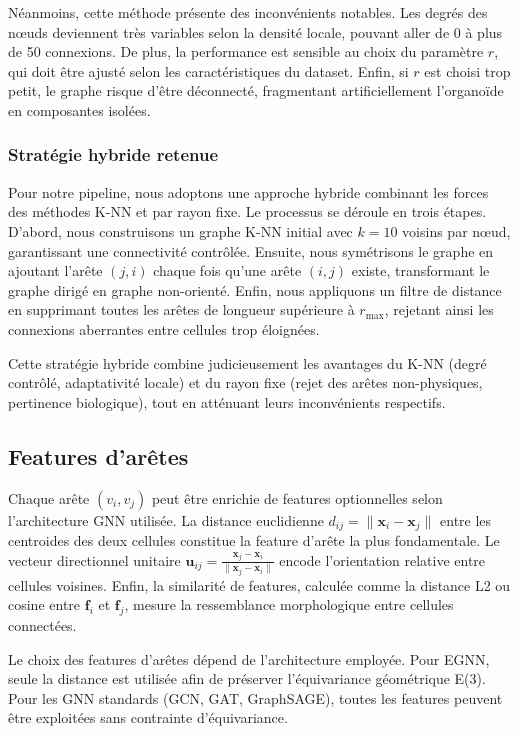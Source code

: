 Néanmoins, cette méthode présente des inconvénients notables. Les degrés des nœuds deviennent très variables selon la densité locale, pouvant aller de 0 à plus de 50 connexions. De plus, la performance est sensible au choix du paramètre $r$, qui doit être ajusté selon les caractéristiques du dataset. Enfin, si $r$ est choisi trop petit, le graphe risque d'être déconnecté, fragmentant artificiellement l'organoïde en composantes isolées.

\subsubsection{Stratégie hybride retenue}

Pour notre pipeline, nous adoptons une approche hybride combinant les forces des méthodes K-NN et par rayon fixe. Le processus se déroule en trois étapes. D'abord, nous construisons un graphe K-NN initial avec $k = 10$ voisins par nœud, garantissant une connectivité contrôlée. Ensuite, nous symétrisons le graphe en ajoutant l'arête $(j,i)$ chaque fois qu'une arête $(i,j)$ existe, transformant le graphe dirigé en graphe non-orienté. Enfin, nous appliquons un filtre de distance en supprimant toutes les arêtes de longueur supérieure à $r_{\max}$, rejetant ainsi les connexions aberrantes entre cellules trop éloignées.

Cette stratégie hybride combine judicieusement les avantages du K-NN (degré contrôlé, adaptativité locale) et du rayon fixe (rejet des arêtes non-physiques, pertinence biologique), tout en atténuant leurs inconvénients respectifs.

\subsection{Features d'arêtes}

Chaque arête $(v_i, v_j)$ peut être enrichie de features optionnelles selon l'architecture GNN utilisée. La distance euclidienne $d_{ij} = \|\mathbf{x}_i - \mathbf{x}_j\|$ entre les centroides des deux cellules constitue la feature d'arête la plus fondamentale. Le vecteur directionnel unitaire $\mathbf{u}_{ij} = \frac{\mathbf{x}_j - \mathbf{x}_i}{\|\mathbf{x}_j - \mathbf{x}_i\|}$ encode l'orientation relative entre cellules voisines. Enfin, la similarité de features, calculée comme la distance L2 ou cosine entre $\mathbf{f}_i$ et $\mathbf{f}_j$, mesure la ressemblance morphologique entre cellules connectées.

Le choix des features d'arêtes dépend de l'architecture employée. Pour EGNN, seule la distance est utilisée afin de préserver l'équivariance géométrique E(3). Pour les GNN standards (GCN, GAT, GraphSAGE), toutes les features peuvent être exploitées sans contrainte d'équivariance.

